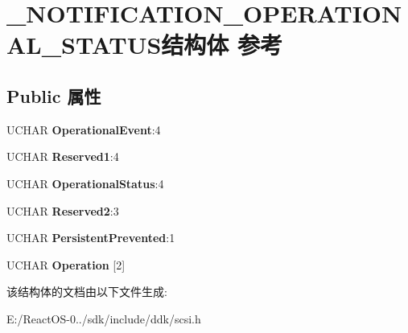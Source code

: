\hypertarget{struct___n_o_t_i_f_i_c_a_t_i_o_n___o_p_e_r_a_t_i_o_n_a_l___s_t_a_t_u_s}{}\section{\+\_\+\+N\+O\+T\+I\+F\+I\+C\+A\+T\+I\+O\+N\+\_\+\+O\+P\+E\+R\+A\+T\+I\+O\+N\+A\+L\+\_\+\+S\+T\+A\+T\+U\+S结构体 参考}
\label{struct___n_o_t_i_f_i_c_a_t_i_o_n___o_p_e_r_a_t_i_o_n_a_l___s_t_a_t_u_s}
\subsection*{Public 属性}
\begin{DoxyCompactItemize}
\item 
\mbox{\label{struct___n_o_t_i_f_i_c_a_t_i_o_n___o_p_e_r_a_t_i_o_n_a_l___s_t_a_t_u_s_a714c5c207a694585bac7a30b43ad26d8}} 
U\+C\+H\+AR {\bfseries Operational\+Event}\+:4
\item 
\mbox{\label{struct___n_o_t_i_f_i_c_a_t_i_o_n___o_p_e_r_a_t_i_o_n_a_l___s_t_a_t_u_s_aadfbcdec6a271425385a7440bab41f16}} 
U\+C\+H\+AR {\bfseries Reserved1}\+:4
\item 
\mbox{\label{struct___n_o_t_i_f_i_c_a_t_i_o_n___o_p_e_r_a_t_i_o_n_a_l___s_t_a_t_u_s_a1905a7c8994921544b13a6e3fbc3af8e}} 
U\+C\+H\+AR {\bfseries Operational\+Status}\+:4
\item 
\mbox{\label{struct___n_o_t_i_f_i_c_a_t_i_o_n___o_p_e_r_a_t_i_o_n_a_l___s_t_a_t_u_s_aafe92f70c0399bdf705dff2695ea0e8a}} 
U\+C\+H\+AR {\bfseries Reserved2}\+:3
\item 
\mbox{\label{struct___n_o_t_i_f_i_c_a_t_i_o_n___o_p_e_r_a_t_i_o_n_a_l___s_t_a_t_u_s_a68142638289aa9b3c4037641b0939a24}} 
U\+C\+H\+AR {\bfseries Persistent\+Prevented}\+:1
\item 
\mbox{\label{struct___n_o_t_i_f_i_c_a_t_i_o_n___o_p_e_r_a_t_i_o_n_a_l___s_t_a_t_u_s_aafc6f75224047adb6d0a25fbc3cadab8}} 
U\+C\+H\+AR {\bfseries Operation} \mbox{[}2\mbox{]}
\end{DoxyCompactItemize}


该结构体的文档由以下文件生成\+:\begin{DoxyCompactItemize}
\item 
E\+:/\+React\+O\+S-\/0../sdk/include/ddk/scsi.\+h\end{DoxyCompactItemize}
